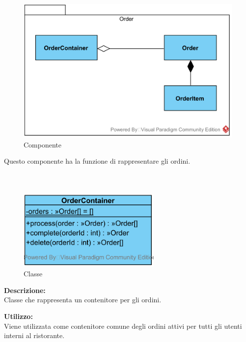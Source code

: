 \paragraph[::Order]{\class}\mbox{}\\ \label{\class}
\begin{figure}[H]
	\centering
	\includegraphics[width=12cm]{./diagrammi/demo/server/orderpkg.png}
	\caption{Componente \class}
\end{figure}

Questo componente ha la funzione di rappresentare gli ordini.

\subparagraph[::OrderContainer]{\class}\mbox{}\\ \label{\class}
\begin{figure}[H]
	\centering
	\includegraphics[width=7cm]{./diagrammi/demo/server/order/ordercontainer.png}
	\caption{Classe \class}
\end{figure}
\textbf{Descrizione:}\\
Classe che rappresenta un contenitore per gli ordini.

\textbf{Utilizzo:}\\
Viene utilizzata come contenitore comune degli ordini attivi per tutti gli utenti interni al ristorante.

%

